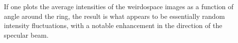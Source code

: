 If one plots the average intensities of the weirdospace images as a
function of angle around the ring, the result is what appears to be
essentially random intensity fluctuations, with a notable enhancement in
the direction of the specular beam.  
